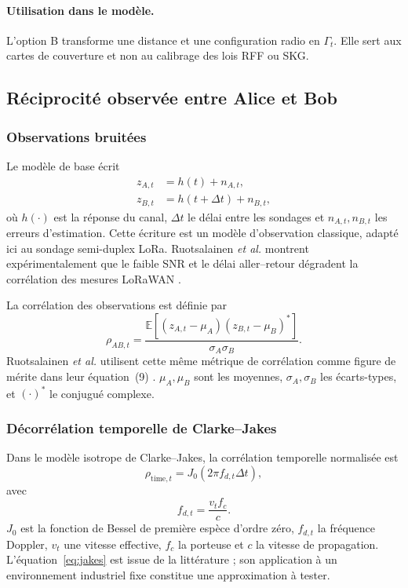 \documentclass[conference,a4paper]{IEEEtran}
\begin{document}
\paragraph{Utilisation dans le modèle.}
L'option B transforme une distance et une configuration radio en $\Gamma_t$. Elle sert aux cartes de couverture et non au calibrage des lois RFF ou SKG.

\subsection{Réciprocité observée entre Alice et Bob}

\subsubsection{Observations bruitées}
Le modèle de base écrit
\begin{align}
    z_{A,t}&=h(t)+n_{A,t},
    \label{eq:obs-alice}\\
    z_{B,t}&=h(t+\Delta t)+n_{B,t},
    \label{eq:obs-bob}
\end{align}
où $h(\cdot)$ est la réponse du canal, $\Delta t$ le délai entre les sondages et $n_{A,t},n_{B,t}$ les erreurs d'estimation. Cette écriture est un modèle d'observation classique, adapté ici au sondage semi-duplex LoRa. Ruotsalainen \emph{et al.} montrent expérimentalement que le faible SNR et le délai aller--retour dégradent la corrélation des mesures LoRaWAN \cite[Sec.~I--II]{ruotsalainen2020}.

La corrélation des observations est définie par
\begin{equation}
\rho_{AB,t}=
\frac{\mathbb{E}\!\left[(z_{A,t}-\mu_A)(z_{B,t}-\mu_B)^*\right]}
{\sigma_A\sigma_B}.
\label{eq:rho-definition}
\end{equation}
Ruotsalainen \emph{et al.} utilisent cette même métrique de corrélation comme figure de mérite dans leur équation~(9) \cite[Eq.~(9)]{ruotsalainen2020}. $\mu_A,\mu_B$ sont les moyennes, $\sigma_A,\sigma_B$ les écarts-types, et $(\cdot)^*$ le conjugué complexe.

\subsubsection{Décorrélation temporelle de Clarke--Jakes}
Dans le modèle isotrope de Clarke--Jakes, la corrélation temporelle normalisée est \cite{jakes1974}
\begin{equation}
    \rho_{\mathrm{time},t}=J_0(2\pi f_{d,t}\Delta t),
    \label{eq:jakes}
\end{equation}
avec
\begin{equation}
    f_{d,t}=\frac{v_t f_c}{c}.
    \label{eq:doppler}
\end{equation}
$J_0$ est la fonction de Bessel de première espèce d'ordre zéro, $f_{d,t}$ la fréquence Doppler, $v_t$ une vitesse effective, $f_c$ la porteuse et $c$ la vitesse de propagation. L'équation~\eqref{eq:jakes} est issue de la littérature ; son application à un environnement industriel fixe constitue une approximation à tester.
\end{document}
